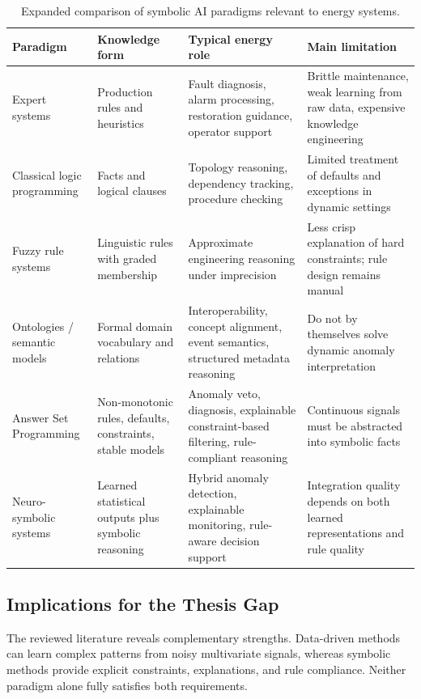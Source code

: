 \begin{table}[H]
	\centering
	\caption{Expanded comparison of symbolic AI paradigms relevant to energy systems.}
	\label{tab:symbolic_energy_methods_expanded}
	\small
	\begin{tabular}{|p{2.8cm}|p{3.5cm}|p{3.5cm}|p{4.7cm}|}
		\hline
		\textbf{Paradigm} & \textbf{Knowledge form} & \textbf{Typical energy role} & \textbf{Main limitation} \\
		\hline
		Expert systems & Production rules and heuristics & Fault diagnosis, alarm processing, restoration guidance, operator support & Brittle maintenance, weak learning from raw data, expensive knowledge engineering \\
		\hline
		Classical logic programming & Facts and logical clauses & Topology reasoning, dependency tracking, procedure checking & Limited treatment of defaults and exceptions in dynamic settings \\
		\hline
		Fuzzy rule systems & Linguistic rules with graded membership & Approximate engineering reasoning under imprecision & Less crisp explanation of hard constraints; rule design remains manual \\
		\hline
		Ontologies / semantic models & Formal domain vocabulary and relations & Interoperability, concept alignment, event semantics, structured metadata reasoning & Do not by themselves solve dynamic anomaly interpretation \\
		\hline
		Answer Set Programming & Non-monotonic rules, defaults, constraints, stable models & Anomaly veto, diagnosis, explainable constraint-based filtering, rule-compliant reasoning & Continuous signals must be abstracted into symbolic facts \\
		\hline
		Neuro-symbolic systems & Learned statistical outputs plus symbolic reasoning & Hybrid anomaly detection, explainable monitoring, rule-aware decision support & Integration quality depends on both learned representations and rule quality \\
		\hline
	\end{tabular}
\end{table}

\subsection{Implications for the Thesis Gap}

The reviewed literature reveals complementary strengths. Data-driven methods can
learn complex patterns from noisy multivariate signals, whereas symbolic methods
provide explicit constraints, explanations, and rule compliance. Neither paradigm
alone fully satisfies both requirements.


